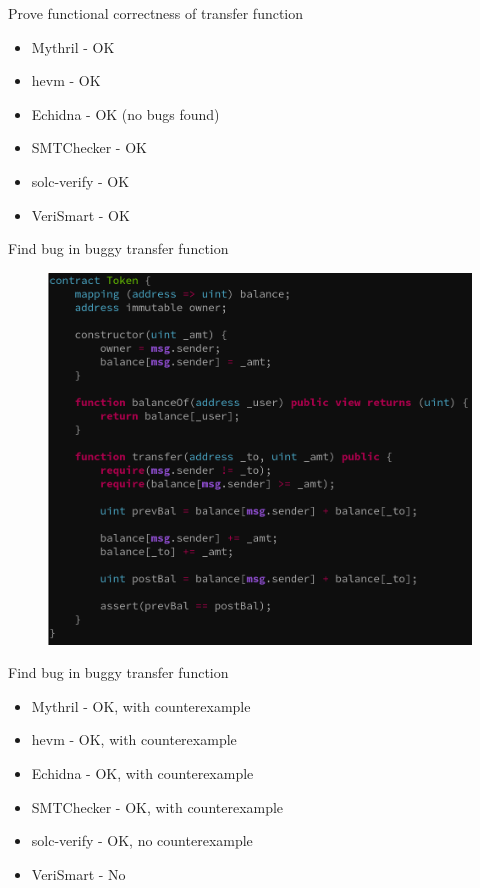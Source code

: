 \documentclass[aspectratio=169,10pt]{beamer}
\begin{document}
\begin{frame}[fragile]
\begin{center}
Prove functional correctness of transfer function
\begin{itemize}
\item Mythril - OK
\item hevm - OK
\item Echidna - OK (no bugs found)
\item SMTChecker - OK
\item solc-verify - OK
\item VeriSmart - OK
\end{itemize}
\end{center}
\end{frame}

\begin{frame}[fragile]
\begin{center}
Find bug in buggy transfer function
\begin{figure}
	\includegraphics[scale=0.23]{images/token_fail}
\end{figure}
\end{center}
\end{frame}

\begin{frame}[fragile]
\begin{center}
Find bug in buggy transfer function
\begin{itemize}
\item Mythril - OK, with counterexample
\item hevm - OK, with counterexample
\item Echidna - OK, with counterexample
\item SMTChecker - OK, with counterexample
\item solc-verify - OK, no counterexample
\item VeriSmart - No
\end{itemize}
\end{center}
\end{frame}
\end{document}
